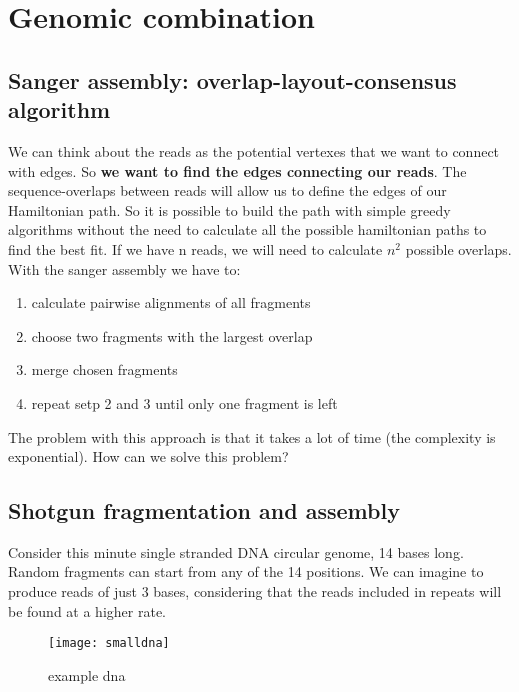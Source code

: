 \section{Genomic combination}

\subsection{Sanger assembly: overlap-layout-consensus algorithm}

We can think about the reads as the potential vertexes that we 
want to connect with edges. 
So \textbf{we want to find the edges connecting our reads}.
The sequence-overlaps between reads will allow us to define the 
edges of our Hamiltonian path.  
So it is possible to build the path with simple greedy algorithms
without the need to calculate all the possible hamiltonian paths to 
find the best fit.
If we have n reads, we will need to calculate $n^2$ possible overlaps.\\

With the sanger assembly we have to:
\begin{enumerate}
  \item calculate pairwise alignments of all fragments
  \item choose two fragments with the largest overlap
  \item merge chosen fragments
  \item repeat setp 2 and 3 until only one fragment is left
\end{enumerate}

The problem with this approach is that it takes a lot of time (the complexity
is exponential). How can we solve this problem?\\

\subsection{Shotgun fragmentation and assembly}

Consider this minute single stranded DNA circular genome, 14 bases long.
Random fragments can start from any of the 14 positions.
We can imagine to produce reads of just 3 bases, considering that the
reads included in repeats will be found at a higher rate.

\begin{figure}[H]
  \centering
  \texttt{[image: smalldna]}
  \caption{example dna}
  \label{fig:smalldna}
\end{figure}

